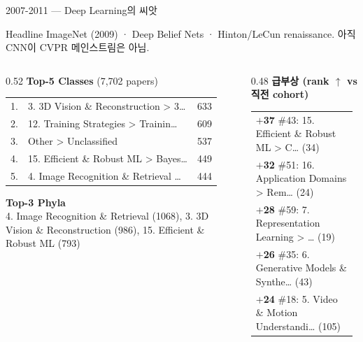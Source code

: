 \documentclass[aspectratio=169,t]{beamer}
\newcommand{\hot}[1]{\textcolor{accentorange}{\textbf{#1}}}
\newcommand{\muted}[1]{\textcolor{mutedgray}{#1}}
\begin{document}
\begin{frame}{2007-2011 \quad — \quad Deep Learning의 씨앗}
\small
\begin{block}{Headline}
ImageNet (2009) · Deep Belief Nets · Hinton/LeCun renaissance. 아직 CNN이 CVPR 메인스트림은 아님.
\end{block}
\vspace{4pt}

\begin{columns}[T,onlytextwidth]
\begin{column}{0.52\textwidth}
\textbf{Top-5 Classes} \muted{\scriptsize (7,702 papers)}\\[2pt]
\scriptsize
\begin{tabular}{@{}rlr@{}}
    1. & 3. 3D Vision \& Reconstruction > 3… & 633 \\
    2. & 12. Training Strategies > Trainin… & 609 \\
    3. & Other > Unclassified & 537 \\
    4. & 15. Efficient \& Robust ML > Bayes… & 449 \\
    5. & 4. Image Recognition \& Retrieval … & 444 \\
\end{tabular}
\vspace{8pt}

\textbf{\small Top-3 Phyla}\\[2pt]
\scriptsize 4. Image Recognition \& Retrieval (1068), 3. 3D Vision \& Reconstruction (986), 15. Efficient \& Robust ML (793)
\end{column}

\begin{column}{0.48\textwidth}
\textbf{급부상 (rank $\uparrow$ vs 직전 cohort)}\\[2pt]
\scriptsize
\begin{tabular}{@{}p{0.95\linewidth}@{}}
    \hot{$+$37} \#43: 15. Efficient \& Robust ML > C… (34) \\
    \hot{$+$32} \#51: 16. Application Domains > Rem… (24) \\
    \hot{$+$28} \#59: 7. Representation Learning > … (19) \\
    \hot{$+$26} \#35: 6. Generative Models \& Synthe… (43) \\
    \hot{$+$24} \#18: 5. Video \& Motion Understandi… (105) \\
\end{tabular}
\end{column}
\end{columns}
\end{frame}
\end{document}
